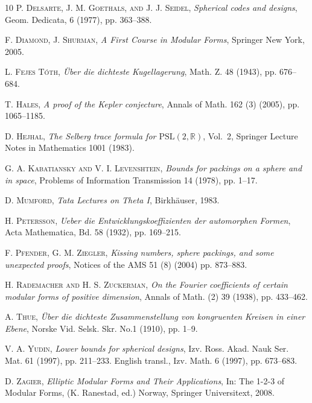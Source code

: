 \documentclass{scrartcl}
\newcommand{\R}{\mathbb{R}}
\begin{document}
\begin{thebibliography}{10}
 \textsc{ P. Delsarte, J. M. Goethals, and J. J. Seidel},
\emph{Spherical codes and designs}, Geom. Dedicata, 6 (1977), pp. 363--388.

 \textsc{ F. Diamond, J. Shurman}, \emph{A First Course in Modular Forms}, Springer New York, 2005.

 \textsc{ L. Fejes T{\'o}th}, {\em {\"U}ber die dichteste Kugellagerung}, Math. Z. 48 (1943), pp. 676--684.

 \textsc{ T. Hales}, {\em A proof of the Kepler conjecture}, Annals of Math. 162 (3) (2005), pp. 1065--1185.

 \textsc{ D. Hejhal}, {\em The Selberg trace formula for $\mathrm{PSL}(2, \R)$}, Vol.~2,  Springer Lecture Notes in Mathematics 1001 (1983).

 \textsc{ G. A. Kabatiansky and V. I. Levenshtein},
{\em Bounds for packings on a sphere and in space},
Problems of Information Transmission 14 (1978), pp. 1--17.

 \textsc{ D. Mumford}, {\em Tata Lectures on Theta I}, Birkh\"auser, 1983.



 \textsc{ H. Petersson}, {\em Ueber die Entwicklungskoeffizienten der automorphen Formen}, Acta Mathematica, Bd. 58 (1932),  pp. 169--215.

 \textsc{ F. Pfender, G. M. Ziegler,} {\em Kissing numbers, sphere packings, and some unexpected proofs}, Notices of the AMS  51 (8) (2004) pp. 873--883.

 \textsc{ H. Rademacher and H. S. Zuckerman}, {\em On the Fourier coefficients of certain modular forms of
positive dimension}, Annals of Math. (2) 39 (1938),  pp. 433--462.

 \textsc{ A. Thue}, {\em {\"U}ber die dichteste Zusammenstellung von kongruenten Kreisen in
einer Ebene}, Norske Vid. Selsk. Skr. No.1 (1910), pp. 1--9.


 \textsc{ V. A. Yudin}, {\em Lower bounds for spherical designs}, Izv. Ross. Akad.
Nauk Ser. Mat. 61 (1997), pp. 211--233. English transl., Izv. Math. 6 (1997), pp. 673--683.

 \textsc{ D. Zagier}, {\em Elliptic Modular Forms and Their Applications}, In:  The 1-2-3 of Modular Forms, (K. Ranestad, ed.) Norway, Springer Universitext, 2008.
\end{thebibliography}
\end{document}
